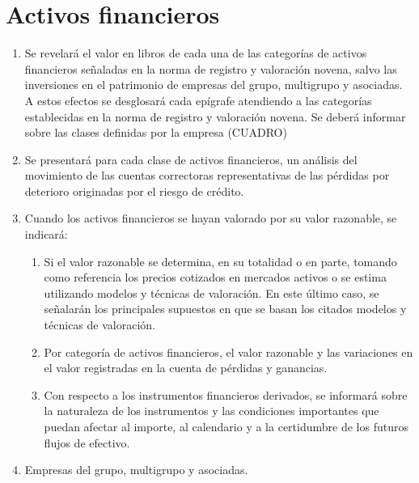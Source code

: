 \documentclass[11pt,a4paper]{article}
\begin{document}
\section{Activos financieros}
\begin{enumerate}
\item Se revelará el valor en libros de cada una de las categorías de activos financieros señaladas en la norma de registro y valoración novena, salvo las inversiones en el patrimonio de empresas del grupo, multigrupo y asociadas.
A estos efectos se desglosará cada epígrafe atendiendo a las categorías establecidas en la norma de registro y valoración novena. Se deberá informar sobre las clases definidas por la empresa (CUADRO)

\item Se presentará para cada clase de activos financieros, un análisis del movimiento de las cuentas correctoras representativas de las pérdidas por deterioro originadas por el riesgo de crédito.

\item Cuando los activos financieros se hayan valorado por su valor razonable, se indicará:
  \begin{enumerate}
    \item Si el valor razonable se determina, en su totalidad o en parte, tomando como referencia los precios cotizados en mercados activos o se estima utilizando modelos y técnicas de valoración. En este último caso, se señalarán los principales supuestos en que se basan los citados modelos y técnicas de valoración.

    \item Por categoría de activos financieros, el valor razonable y las variaciones en el valor registradas en la cuenta de pérdidas y ganancias.

    \item Con respecto a los instrumentos financieros derivados, se informará sobre la naturaleza de los instrumentos y las condiciones importantes que puedan afectar al importe, al calendario y a la certidumbre de los futuros flujos de efectivo.
  \end{enumerate}

\item Empresas del grupo, multigrupo y asociadas.


\end{enumerate}
\end{document}
